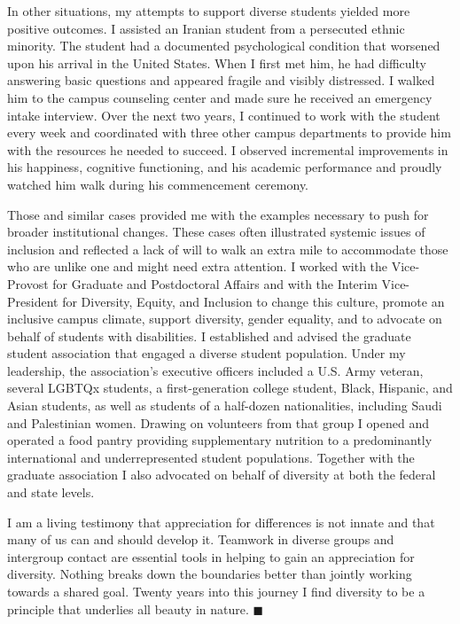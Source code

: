 \documentclass[11pt,letterpaper]{article}
\begin{document}
\begin{multicols}{3}
\par In other situations, my attempts to support diverse students yielded more positive outcomes. I assisted an Iranian student from a persecuted ethnic minority. The student had a documented psychological condition that worsened upon his arrival in the United States. When I first met him, he had difficulty answering basic questions and appeared fragile and visibly distressed. I walked him to the campus counseling center and made sure he received an emergency intake interview. Over the next two years, I continued to work with the student every week and coordinated with three other campus departments to provide him with the resources he needed to succeed. I observed incremental improvements in his happiness, cognitive functioning, and his academic performance and proudly watched him walk during his commencement ceremony.
\par Those and similar cases provided me with the examples necessary to push for broader institutional changes. These cases often illustrated systemic issues of inclusion and reflected a lack of will to walk an extra mile to accommodate those who are unlike one and might need extra attention. I worked with the Vice-Provost for Graduate and Postdoctoral Affairs and with the Interim Vice-President for Diversity, Equity, and Inclusion to change this culture, promote an inclusive campus climate, support diversity, gender equality, and to advocate on behalf of students with disabilities. I established and advised the graduate student association that engaged a diverse student population. Under my leadership, the association's executive officers included a U.S. Army veteran, several LGBTQx students, a first-generation college student, Black, Hispanic, and Asian students, as well as students of a half-dozen nationalities, including Saudi and Palestinian women. Drawing on volunteers from that group I opened and operated a food pantry providing supplementary nutrition to a predominantly international and underrepresented student populations. Together with the graduate association I also advocated on behalf of diversity at both the federal and state levels.
\par I am a living testimony that appreciation for differences is not innate and that many of us can and should develop it. Teamwork in diverse groups and intergroup contact are essential tools in helping to gain an appreciation for diversity. Nothing breaks down the boundaries better than jointly working towards a shared goal. Twenty years into this journey I find diversity to be a principle that underlies all beauty in nature. $\blacksquare$ %


\end{multicols}
\end{document}
